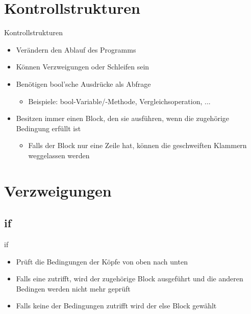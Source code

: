 \section{Kontrollstrukturen}
\begin{frame}{Kontrollstrukturen}
	\begin{itemize}
		\item Verändern den Ablauf des Programms
		\item Können Verzweigungen oder Schleifen sein
		\item Benötigen bool'sche Ausdrücke als Abfrage
		\begin{itemize}
			\item Beispiele: bool-Variable/-Methode, Vergleichsoperation, ...
		\end{itemize}
		\item Besitzen immer einen Block, den sie ausführen, wenn die zugehörige Bedingung erfüllt ist
		\begin{itemize}
			\item Falls der Block nur eine Zeile hat, können die geschweiften Klammern weggelassen werden
		\end{itemize}
	\end{itemize}
\end{frame}

\section{Verzweigungen}
\subsection{if}
\begin{frame}{if}
	\begin{itemize}
		\item Prüft die Bedingungen der Köpfe von oben nach unten
		\item Falls eine zutrifft, wird der zugehörige Block ausgeführt und die anderen Bedingen werden nicht mehr geprüft
		\item Falls keine der Bedingungen zutrifft wird der \alert{else} Block gewählt
	\end{itemize}
	
\end{frame}

